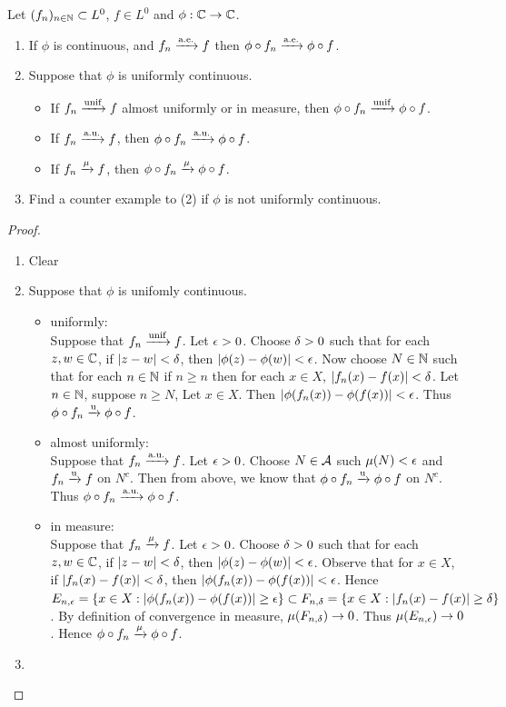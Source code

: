 \documentclass{book}
\begin{document}
	\begin{ex}   
		Let $(f_n)_{n \in \mathbb{N}} \subset L^0$, $f \in L^0$ and $\phi :\mathbb{C} \rightarrow \mathbb{C}$. 
		\begin{enumerate}
			\item If $\phi$ is continuous, and $f_n \xrightarrow{\text{a.e.}} f$ then $\phi \circ f_n \xrightarrow{\text{a.e.}} \phi \circ f$.
			\item Suppose that $\phi$ is uniformly continuous.
			\begin{itemize}
				\item If $f_n \xrightarrow{\text{unif}} f$ almost uniformly or in measure, then $\phi \circ f_n \xrightarrow{\text{unif}} \phi \circ f$. 
				\item If $f_n \xrightarrow{\text{a.u.}} f$, then $\phi \circ f_n \xrightarrow{\text{a.u.}} \phi \circ f$.
				\item If $f_n \xrightarrow{\mu} f$, then $\phi \circ f_n \xrightarrow{\mu} \phi \circ f$.
			\end{itemize}
			\item Find a counter example to (2) if $\phi$ is not uniformly continuous.
		\end{enumerate} 
	\end{ex}
	
	\begin{proof}\
		\begin{enumerate}
			\item Clear
			\item Suppose that $\phi$ is unifomly continuous. 
			\begin{itemize}
				\item uniformly: \\
				Suppose that $f_n \xrightarrow{\text{unif}} f$. Let $\epsilon > 0$. Choose $\delta >0$ such that for each $z,w \in \mathbb{C}$, if $|z-w|<\delta$, then $|\phi(z) - \phi(w)| < \epsilon$. Now choose $N \in \mathbb{N}$ such that for each $n \in \mathbb{N}$ if $n \geq n$ then for each $x \in X$, $|f_n(x)-f(x)| < \delta$. Let $n \in \mathbb{N}$, suppose $n \geq N$, Let $x \in X$. Then $|\phi(f_n(x)) - \phi(f(x))| < \epsilon$. Thus $\phi \circ f_n \xrightarrow{\text{u}} \phi \circ f$. 
				\item almost uniformly: \\
				Suppose that $f_n \xrightarrow{\text{a.u.}} f$. Let $\epsilon > 0$. Choose $N \in \mathcal{A}$ such $\mu(N) < \epsilon$ and $f_n \xrightarrow{\text{u}} f$ on $N^c$. Then from above, we know that $\phi \circ f_n \xrightarrow{\text{u}} \phi \circ f$ on $N^c$. Thus $\phi \circ f_n \xrightarrow{\text{a.u.}} \phi \circ f$.
				\item in measure:\\ Suppose that $f_n \xrightarrow{\mu} f$. Let $\epsilon > 0$. Choose $\delta >0$ such that for each $z,w \in \mathbb{C}$, if $|z-w|<\delta$, then $|\phi(z) - \phi(w)| < \epsilon$. Observe that for $x \in X$, if $|f_n(x) - f(x)| < \delta$, then $|\phi(f_n(x)) - \phi(f(x))| < \epsilon$. Hence $E_{n,\epsilon} = \{x \in X: |\phi(f_n(x)) - \phi(f(x))| \geq \epsilon\} \subset F_{n,\delta} = \{x \in X: |f_n(x) - f(x)| \geq \delta\}$. By definition of convergence in measure, $\mu(F_{n,\delta}) \rightarrow 0$. Thus $\mu(E_{n,\epsilon}) \rightarrow 0$. Hence $\phi \circ f_n \xrightarrow{\mu} \phi \circ f$.
			\end{itemize}
			\item {}
		\end{enumerate}
	\end{proof}
	
\end{document}
